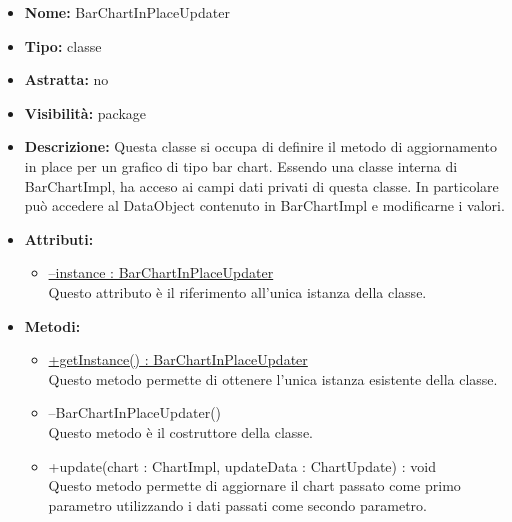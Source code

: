 	
			
			\begin{itemize}
			\item \textbf{Nome:} BarChartInPlaceUpdater
			\item \textbf{Tipo:} classe
			
		\item \textbf{Astratta:}
		no
			\item \textbf{Visibilità:} package
			\item \textbf{Descrizione:} Questa classe si occupa di definire il metodo di aggiornamento in place per un grafico di tipo bar chart. Essendo una classe interna di BarChartImpl, ha acceso ai campi dati privati di questa classe. In particolare può accedere al DataObject contenuto in BarChartImpl e modificarne i valori.
			\item \textbf{Attributi:}
				\begin{itemize}
				\setlength{\itemsep}{5pt}
				
					\item[\ding{111}] \underline{--instance : BarChartInPlaceUpdater} \\ [1mm] Questo attributo è il riferimento all'unica istanza della classe.
				\end{itemize}
		
			\item \textbf{Metodi:}
				\begin{itemize}
				\setlength{\itemsep}{5pt}
				
					\item[\ding{111}] {\underline{+getInstance() : BarChartInPlaceUpdater}} \\ [1mm] Questo metodo permette di ottenere l'unica istanza esistente della classe.
					\item[\ding{111}] {{--BarChartInPlaceUpdater()}} \\ [1mm] Questo metodo è il costruttore della classe.
					\item[\ding{111}] {{+update(chart : ChartImpl, updateData : ChartUpdate) : void}} \\ [1mm] Questo metodo permette di aggiornare il chart passato come primo parametro utilizzando i dati passati come secondo parametro.
				\end{itemize}
		
			\end{itemize}

